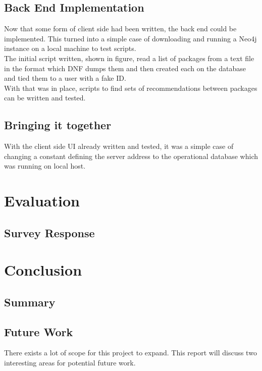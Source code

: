 \documentclass{l4proj}
\begin{document}
\section{Back End Implementation}
Now that some form of client side had been written, the back end could be implemented. This turned into a simple case of downloading and running a Neo4j instance on a local machine to test scripts.\\
The initial script written, shown in figure, read a list of packages from a text file in the format which DNF dumps them and then created each on the database and tied them to a user with a fake ID.\\
With that was in place, scripts to find sets of recommendations between packages can be written and tested.

\section{Bringing it together}
With the client side UI already written and tested, it was a simple case of changing a constant defining the server address to the operational database which was running on local host.
 
 
\chapter{Evaluation}
\section{Survey Response}
 
 
\chapter{Conclusion}

\section{Summary}
\section{Future Work}
There exists a lot of scope for this project to expand. This report will discuss two interesting areas for potential future work.
\end{document}
